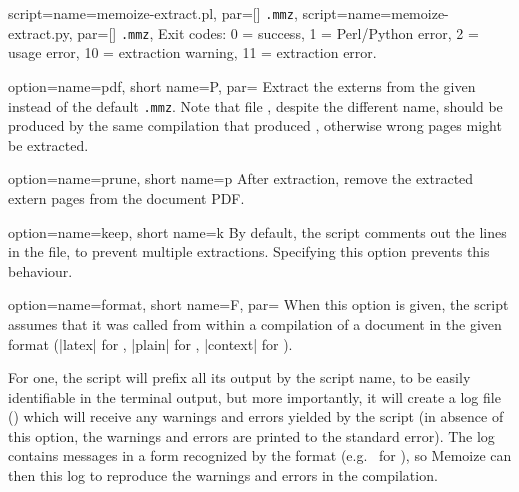 \documentclass[a4paper,11pt]{article}
\begin{document}
\begin{doc}{
    script={name=memoize-extract.pl, par=[] \texttt{.mmz}},
    script={name=memoize-extract.py, par=[] \texttt{.mmz}},
  }
  Exit codes: 0 = success, 1 = Perl/Python error, 2 = usage error, 10 =
  extraction warning, 11 = extraction error.
  
  \begin{doc}{
      option={name=pdf, short name=P, par=}
    }
    Extract the externs from the given  instead of the default
    \texttt{.mmz}.  Note that file , despite the different
    name, should be produced by the same compilation that produced
    \dmmz, otherwise wrong pages might be extracted.
  \end{doc}
  \begin{doc}{
      option={name=prune, short name=p}
    }
    After extraction, remove the extracted extern pages from the document PDF.
  \end{doc}
  \begin{doc}{
      option={name=keep, short name=k}
    }
    By default, the script comments out the  lines in the
    \dmmz file, to prevent multiple extractions.  Specifying this option
    prevents this behaviour.
  \end{doc}
  \begin{doc}{
      option={name=format, short name=F,
        par=\Alt{}\Alt{}}
    }
    When this option is given, the script assumes that it was called from
    within a  compilation of a document in the given format
    (|latex| for , |plain| for , |context| for
    ).
    
    For one, the script will prefix all its output by the script name, to be
    easily identifiable in the terminal output, but more importantly, it will
    create a log file () which will receive any
    warnings and errors yielded by the script (in absence of this option, the
    warnings and errors are printed to the standard error).  The log contains
    messages in a form recognized by the format (e.g.\  for
    ), so Memoize can then  this log to reproduce the
    warnings and errors in the compilation.


\end{doc}
\end{doc}
\end{document}
